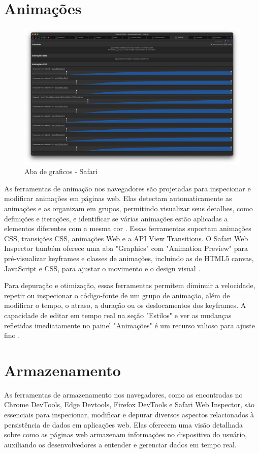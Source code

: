 \section{Animações}
\begin{figure}[h!]
    \centering
    \includegraphics[width=0.7\linewidth]{assets/tools/safari-graficos.png}
    \caption{Aba de graficos - Safari }
    \label{fig:enter-label}
\end{figure}

As ferramentas de animação nos navegadores são projetadas para inspecionar e modificar animações em páginas web. Elas detectam automaticamente as animações e as organizam em grupos, permitindo visualizar seus detalhes, como definições e iterações, e identificar se várias animações estão aplicadas a elementos diferentes com a mesma cor \cite{chrome}. Essas ferramentas suportam animações CSS, transições CSS, animações Web e a API View Transitions. O Safari Web Inspector também oferece uma aba "Graphics" com "Animation Preview" para pré-visualizar keyframes e classes de animações, incluindo as de HTML5 canvas, JavaScript e CSS, para ajustar o movimento e o design visual \cite{apple}.

Para depuração e otimização, essas ferramentas permitem diminuir a velocidade, repetir ou inspecionar o código-fonte de um grupo de animação, além de modificar o tempo, o atraso, a duração ou os deslocamentos dos keyframes. A capacidade de editar \texttt{\@keyframes} em tempo real na seção "Estilos" e ver as mudanças refletidas imediatamente no painel "Animações" é um recurso valioso para ajuste fino \cite{chrome}. 

\section{Armazenamento}
As ferramentas de armazenamento nos navegadores, como as encontradas no Chrome DevTools, Edge Devtools, Firefox DevTools e Safari Web Inspector, são essenciais para inspecionar, modificar e depurar diversos aspectos relacionados à persistência de dados em aplicações web. Elas oferecem uma visão detalhada sobre como as páginas web armazenam informações no dispositivo do usuário, auxiliando os desenvolvedores a entender e gerenciar dados em tempo real.

